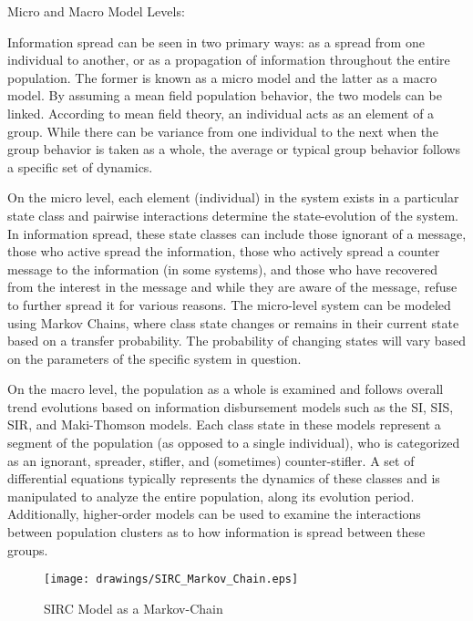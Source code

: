 \noindent Micro and Macro Model Levels:

Information spread can be seen in two primary ways: as a spread from one individual to another, or as a propagation of information throughout the entire population. The former is known as a micro model and the latter as a macro model. By assuming a mean field population behavior, the two models can be linked. According to mean field theory, an individual acts as an element of a group. While there can be variance from one individual to the next when the group behavior is taken as a whole, the average or typical group behavior follows a specific set of dynamics.

On the micro level, each element (individual) in the system exists in a particular state class and pairwise interactions determine the state-evolution of the system. In information spread, these state classes can include those ignorant of a message, those who active spread the information, those who actively spread a counter message to the information (in some systems), and those who have recovered from the interest in the message and while they are aware of the message, refuse to further spread it for various reasons. The micro-level system can be modeled using Markov Chains, where class state changes or remains in their current state based on a transfer probability. The probability of changing states will vary based on the parameters of the specific system in question.

On the macro level, the population as a whole is examined and follows overall trend evolutions based on information disbursement models such as the SI, SIS, SIR, and Maki-Thomson models. Each class state in these models represent a segment of the population (as opposed to a single individual), who is categorized as an ignorant, spreader, stifler, and (sometimes) counter-stifler. A set of differential equations typically represents the dynamics of these classes and is manipulated to analyze the entire population, along its evolution period. Additionally, higher-order models can be used to examine the interactions between population clusters as to how information is spread between these groups.

\begin{figure}[!htbp] \centering
  \texttt{[image: drawings/SIRC\_Markov\_Chain.eps]}
  \caption{SIRC Model as a Markov-Chain}
  \label{fig:SIRC_Markov_Chain}
\end{figure}